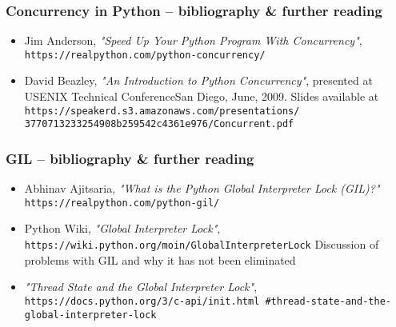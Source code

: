 \documentclass{beamer}
\begin{document}
    \begin{frame}
        \frametitle{Concurrency in Python -- bibliography \& further reading}

        \begin{itemize}
            \item Jim Anderson, \emph{"Speed Up Your Python Program With Concurrency"},
            \texttt{https://realpython.com/python-concurrency/}
            \item David Beazley, \emph{"An Introduction to Python Concurrency"},
                presented at USENIX Technical ConferenceSan Diego, June, 2009.
                Slides available at \texttt{https://speakerd.s3.amazonaws.com/presentations/
            3770713233254908b259542c4361e976/Concurrent.pdf}
        \end{itemize}
    \end{frame}

    \begin{frame}
        \frametitle{GIL -- bibliography \& further reading}
        \begin{itemize}
            \item Abhinav Ajitsaria, \emph{"What is the Python Global Interpreter Lock (GIL)?"}
            \texttt{https://realpython.com/python-gil/}
            \item Python Wiki, \emph{"Global Interpreter Lock"},
            \texttt{https://wiki.python.org/moin/GlobalInterpreterLock}
            \footnotesize Discussion of problems with GIL and why it has not been eliminated
            \item \emph{"Thread State and the Global Interpreter Lock"},
            \texttt{https://docs.python.org/3/c-api/init.html
            \#thread-state-and-the-global-interpreter-lock}
        \end{itemize}

    \end{frame}

%    
%    
%
\end{document}
